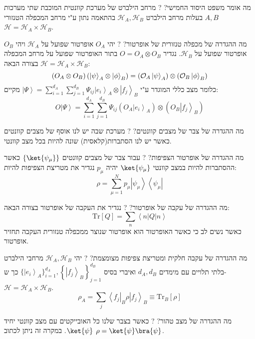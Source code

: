 \documentclass{tstextbook}
\begin{document}
מה אומר משפט היסוד החמישי?
?
מרחב הילברט של מערכת קוונטית המוכבת שתי מערכות \(A,B\) בעלות מרחב הילברט \(\mathcal{H}_{A},\mathcal{H}_{B}\) בהתאמה נתון ע"י מרחב המכפלה הטנזורי \(\mathcal{H}=\mathcal{H}_{A}\times \mathcal{H}_{B}\).

מה ההגדרה של מכפלה טנזורית של אופרטור?
?
יהי \(O_{A}\) אופרטור שפועל על \(\mathcal{H}_{A}\) ויהי \(O_{B}\) אופרטור שפועל על \(\mathcal{H}_{B}\). נגדיר \(O=O_{A}\otimes O_{B}\) בתור האופרטור שפועל על מרחב המכפלה \(\mathcal{H}=\mathcal{H}_{A}\times \mathcal{H}_{B}\) בצורה הבאה:
$$\left({ O}_{A}\otimes{ O}_{B}\right)\left(\left|\psi\right\rangle_{A}\otimes\left|\phi\right\rangle_{B}\right)=\left({\cal O}_{A}\left|\psi\right\rangle_{A}\right)\otimes\left({\cal O}_{B}\left|\phi\right\rangle_{B}\right)$$
כלומר מצב כללי המוגדר ע"י \(\left|\Psi\right\rangle=\sum_{i=1}^{d_{A}}\sum_{j=1}^{d_{B}}\Psi_{i j}\left|e_{i}\right\rangle_{A}\otimes\left|f_{j}\right\rangle_{B}\) מקיים:
$${ O}\left|\Psi\right\rangle=\sum_{i=1}^{d_{A}}\sum_{j=1}^{d_{B}}\Psi_{i j}\left({ O}_{A}\left|e_{i}\right\rangle_{A}\right)\otimes\left({ O}_{B}\left|f_{j}\right\rangle_{B}\right)$$

מה ההגדרה של צבר של מצבים קוונטים?
?
מערכת שבה יש לנו אוסף של מצבים קוונטים כאשר יש לנו הסתברות(קלאסית) שונה להיות בכל מצב קוונטי.

מה ההגדרה של אופרטור הצפיפות?
?
עבור צבר של מצבים קוונטים \(\left\{  \ket{\psi_{\mu}}  \right\}\) כאשר ההסתברות להיות במצב קוונטי \(\ket{\psi_{\mu}}\) יהיה \(p_{\mu}\) נגדיר את מטריצת הצפיפות להיות:
$$\rho=\sum_{\mu=1}^{N}p_{\mu}\left|\psi_{\mu}\right\rangle\left\langle\psi_{\mu}\right|$$

מה ההגדרה של עקבה של אופרטור?
?
נגדיר את העקבה של אופרטור בצורה הבאה:
$${\mathrm{Tr}}\left[Q\right]=\sum_{n}\left\langle n\right|Q\left|n\right\rangle$$
כאשר נשים לב כי כאשר האופרטור הוא אופרטור שנוצר ממכפלה טנזורית העקבה תחזיר אופרטור.

מה ההגדרה של עקבה חלקית ומטריצת צפיפות מצומצמת?
?
יהי \(\mathcal{H}_{A},\mathcal{H}_{B}\) מרחבי הילברט בלתי תלויים עם מימדים \(d_{A},d_{B}\) ואיברי בסיס \(\{\left|e_{i}\right\rangle_{A}\}_{i=1}^{d_{A}},\left\{\left|f_{j}\right\rangle_{B}\right\}_{j=1}^{d_{B}}\) כך ש-\(\mathcal{H}=\mathcal{H}_{A}\times \mathcal{H}_{B}\). 
$$\rho_{A}=\sum_{j}\left\langle f_{j}\right|_{B}\rho\left|f_{j}\right\rangle_{B}\equiv\mathrm{Tr}_{B}\left[\rho\right]$$

מה ההגדרה של מצב טהור?
?
כאשר בצבר שלנו כל האובייקטים עם מצב קוונטי יחיד \(\ket{\psi}\). במקרה זה ניתן לכתוב \(\rho=\ket{\psi}\bra{\psi}\).
\end{document}

